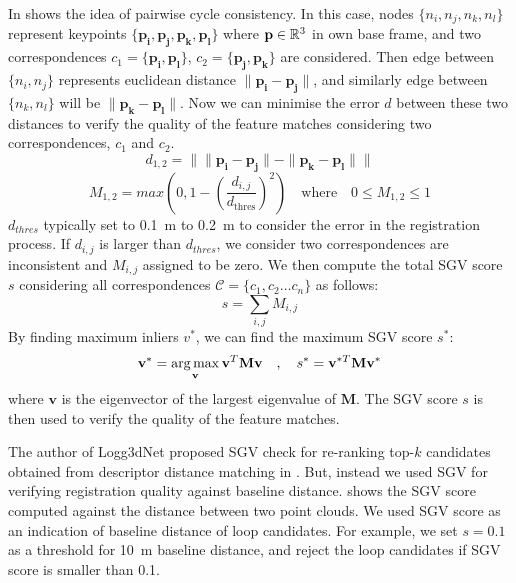 In  shows the idea of pairwise cycle consistency. In this case, nodes $\{n_i, n_j, n_k, n_l\}$ represent keypoints $\{\mathbf{p_i}, \mathbf{p_j}, \mathbf{p_k}, \mathbf{p_l}\}$ where $\mathbf{p} \in \mathbb{R}^{3}$ in own base frame, and two correspondences $c_1 =\{\mathbf{p_i}, \mathbf{p_l}\}$, $c_2=\{\mathbf{p_j}, \mathbf{p_k}\}$ are considered. Then edge between $\{n_i, n_j\}$  represents euclidean distance $\| \mathbf{p_i}-\mathbf{p_j} \|$, and similarly edge between $\{n_k, n_l\}$ will be $\| \mathbf{p_k}-\mathbf{p_l} \|$. Now we can minimise the error $d$ between these two distances to verify the quality of the feature matches considering two correspondences, $c_1$ and $c_2$. 
\begin{equation}
  d_{1,2} = \|\| \mathbf{p_i}-\mathbf{p_j} \| - \| \mathbf{p_k}-\mathbf{p_l} \| \| 
\end{equation}
\begin{equation}
  M_{1,2} = max( 0 , 1 - \left(\frac{d_{i,j}}{d_{\text{thres}}}\right)^2 ) 
  \quad \text{where} \quad 0 \leq M_{1,2} \leq 1 
\end{equation}
$d_{thres}$ typically set to \SI{0.1}{\meter} to \SI{0.2}{\meter} to consider the error in the registration process. If $d_{i,j}$ is larger than $d_{thres}$, we consider two correspondences are inconsistent and $M_{i,j}$ assigned to be zero.  
We then compute the total SGV score $s$ considering all correspondences $\mathcal{C}=\{c_1, c_2 \ldots c_n\}$ as follows:
\begin{equation}
  s = \sum_{i,j} M_{i,j} 
\end{equation}
By finding maximum inliers $v^{*}$, we can find the maximum SGV score $s^{*}$: 
\begin{equation}
  \mathbf{v^{*}} = \operatorname*{arg\,max}_{\mathbf{v}} \mathbf{v}^T \mathbf{M} \mathbf{v} \quad, \quad
  s^{*} = \mathbf{v}^{*T} \mathbf{M} \mathbf{v}^{*}
\end{equation}
where $\mathbf{v}$ is the eigenvector of the largest eigenvalue of $\mathbf{M}$. The SGV score $s$ is then used to verify the quality of the feature matches.

The author of Logg3dNet proposed SGV check for re-ranking top-$k$ candidates obtained from descriptor distance matching in . But, instead we used SGV for verifying registration quality against baseline distance.  shows the SGV score computed against the distance between two point clouds. We used SGV score as an indication of baseline distance of loop candidates. For example, we set $s=0.1$ as a threshold for \SI{10}{\meter} baseline distance, and reject the loop candidates if SGV score is smaller than 0.1.



